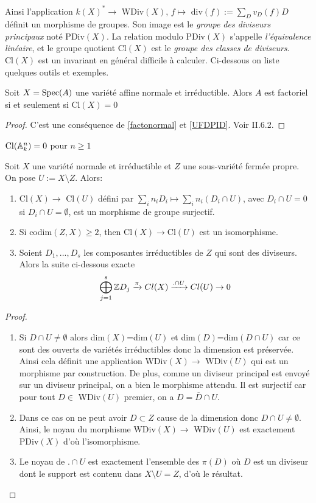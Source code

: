 Ainsi l'application $k(X)^*\rightarrow $ WDiv$(X),\, f\mapsto $ div$(f):=\sum_D v_D(f)D$ définit un morphisme de groupes. Son image est le \textit{groupe des diviseurs principaux} noté PDiv$(X)$. La relation modulo PDiv$(X)$ s'appelle \textit{l'équivalence linéaire}, et le groupe quotient Cl$(X)$ est le \textit{groupe des classes de diviseurs}.\\
Cl$(X)$ est un invariant en général difficile à calculer. Ci-dessous on liste quelques outils et exemples.


\begin{prop}
Soit $X=\operatorname{Spec}(A)$ une variété affine normale et irréductible. Alors $A$ est factoriel si et seulement si Cl$(X)=0$
\end{prop}
\begin{proof}
C'est une conséquence de \ref{factonormal} et \ref{UFDPID}. Voir \cite{Hartshorne} II.6.2.
\end{proof}

\begin{cor}
$\operatorname{Cl}(\mathbb{A} ^n_k)=0$ pour $n\geq 1$
\end{cor}

\begin{thm}\label{divexactseq}
Soit $X$ une variété normale et irréductible et $Z$ une sous-variété fermée propre. On pose $U:=X\setminus Z$. Alors:
\begin{enumerate}
\item Cl$(X)\rightarrow$ Cl$(U)$ défini par $\sum_i n_iD_i\mapsto \sum_i n_i(D_i\cap U)$, avec $D_i\cap U = 0$ si $D_i\cap U=\emptyset $, est un morphisme de groupe surjectif.
\item Si codim$(Z,X)\geq 2$, then Cl$(X)\rightarrow$Cl$(U)$ est un isomorphisme.
\item Soient $D_1,..., D_s$ les composantes irréductibles de $Z$ qui sont des diviseurs. Alors la suite ci-dessous exacte $$\bigoplus_{j=1}^s \mathbb{Z} D_j \xrightarrow{\pi} Cl(X) \xrightarrow{.\cap U} Cl(U) \rightarrow 0 $$
\end{enumerate}
\end{thm}
\begin{proof}
\begin{enumerate}
\item Si $D\cap U\neq \emptyset$ alors dim$(X)$=dim$(U)$ et dim$(D)$=dim$(D\cap U)$ car ce sont des ouverts de variétés irréductibles donc la dimension est préservée. Ainsi cela définit une application WDiv$(X)\rightarrow$ WDiv$(U)$ qui est un morphisme par construction. De plus, comme un diviseur principal est envoyé sur un diviseur principal, on a bien le morphisme attendu. Il est surjectif car pour tout $D\in$ WDiv$(U)$ premier, on a $D=\overline{D}\cap U$.
\item Dans ce cas on ne peut avoir $D\subset Z$ cause de la dimension donc $D\cap U\neq \emptyset$. Ainsi, le noyau du morphisme WDiv$(X)\rightarrow$ WDiv$(U)$ est exactement PDiv$(X)$ d'où l'isomorphisme.
\item Le noyau de $.\cap U$ est exactement l'ensemble des $\pi(D)$ où $D$ est un diviseur dont le support est contenu dans $X\setminus U=Z$, d'où le résultat.
\end{enumerate}
\end{proof}


